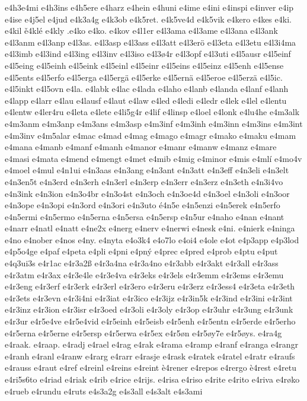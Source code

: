 e4h3e4mi
e4h3ins
e4h5ere
e4harz
e4hein
e4huni
e4ime
e4ini
e4inspi
e4inver
e4ip
e4ise
e4j5el
e4jud
e4k3a4g
e4k3ob
e4k5ret.
e4k5ve4d
e4k5vik
e4kero
e4kes
e4ki.
e4kil
ě4klé
e4kly
.e4ko
e4ko.
e4kov
e4l1er
e4l3ama
e4l3ame
e4l3ana
e4l3ank
e4l3anm
e4l3anp
e4l3as.
e4l3asp
e4l3ass
e4l3att
e4l3erö
e4l3eta
e4l3etu
e4l3i4ma
e4l3imb
e4l3ind
e4l3ing
e4l3inv
e4l3iso
e4l3ø4r
e4l3opf
e4l3uti
e4l5ausr
e4l5einf
e4l5eing
e4l5einh
e4l5eink
e4l5einl
e4l5einr
e4l5eins
e4l5einz
e4l5enh
e4l5ense
e4l5ents
e4l5erfo
e4l5erga
e4l5ergä
e4l5erke
e4l5ernä
e4l5eroe
e4l5erzä
e4l5ic.
e4l5inkt
e4l5ovn
e4la.
e4labk
e4lac
e4lada
e4laho
e4lanb
e4landa
e4lanf
e4lanh
e4lapp
e4larr
e4lau
e4lausf
e4laut
e4law
e4led
e4ledi
e4ledr
e4lek
e4lel
e4lentu
e4lentw
e4ler4ru
e4leta
e4lete
e4li5g4r
e4lif
e4linsp
e4loel
e4lonk
e4lu4he
e4m3alk
e4m3anm
e4m3anp
e4m3ans
e4m3asp
e4m3inf
e4m3inh
e4m3inn
e4m3ins
e4m3int
e4m3inv
e4m5alar
e4mac
e4mad
e4mag
e4mago
e4magr
e4mako
e4maku
e4mam
e4mana
e4manb
e4manf
e4manh
e4manor
e4manr
e4manw
e4manz
e4mare
e4masi
e4mata
e4mend
e4mengt
e4met
e4mib
e4mig
e4minor
e4mis
e4mlí
e4mo4v
e4moel
e4mul
e4n1ui
e4n3aas
e4n3ang
e4n3ant
e4n3att
e4n3eff
e4n3eli
e4n3elt
e4n3en5t
e4n3erd
e4n3erh
e4n3erl
e4n3erp
e4n3err
e4n3erz
e4n3eth
e4n3i4vo
e4n3ink
e4n3ion
e4n3o4br
e4n3o4st
e4n3och
e4n3oe4d
e4n3oel
e4n3oli
e4n3oor
e4n3ope
e4n3opi
e4n3ord
e4n3ori
e4n3uto
é4n5e
e4n5enzi
e4n5erek
e4n5erfo
e4n5ermi
e4n5ermo
e4n5erna
e4n5ersa
e4n5ersp
e4n5ur
e4naho
e4nan
e4nant
e4narr
e4natl
e4natt
e4ne2x
e4nerg
e4nerv
e4nerwi
e4nesk
e4ni.
e4nierk
e4ninga
e4no
e4nober
e4nos
e4ny.
e4nyta
e4o3k4
e4o7lo
e4oi4
e4ole
e4ot
e4p3app
e4p3lod
e4p5o4ge
e4paf
e4peta
e4pli
e4pni
e4pný
e4prec
e4pred
e4prob
e4ptu
e4put
e4q3ui3s
e4r1ac
e4r3a2ß
e4r3a4na
e4r3a4no
e4r3abb
e4r3akt
e4r3all
e4r3ass
e4r3atm
e4r3ax
e4r3e4le
e4r3e4va
e4r3eks
e4r3els
e4r3emm
e4r3ems
e4r3emu
e4r3eng
e4r3erf
e4r3erk
e4r3erl
e4r3ero
e4r3eru
e4r3erz
e4r3ess4
e4r3eta
e4r3eth
e4r3ets
e4r3evn
e4r3i4ni
e4r3iat
e4r3ico
e4r3ijz
e4r3in5k
e4r3ind
e4r3ini
e4r3int
e4r3inz
e4r3ion
e4r3isr
e4r3oed
e4r3oli
e4r3oly
e4r3op
e4r3uhr
e4r3ung
e4r3unk
e4r3ur
e4r5e4ve
e4r5e4vid
e4r5einh
e4r5eisb
e4r5enh
e4r5entn
e4r5erde
e4r5erho
e4r5erna
e4r5erne
e4r5ersp
e4r5erwa
e4r5ex
e4r5øn
e4r5øy7e
e4r5øys.
e4ra4g
e4raak.
e4raap.
e4radj
e4rael
e4rag
e4rak
e4rama
e4ramp
e4ranf
e4ranga
e4rangr
e4ranh
e4ranl
e4ranw
e4rarg
e4rarr
e4rasje
e4rask
e4ratek
e4ratel
e4ratr
e4raufs
e4rauss
e4raut
e4ref
e4reinl
e4reins
e4reint
è4rener
e4repos
e4rergo
è4rest
e4retu
e4ri5s6to
e4riad
e4riak
e4rib
e4rice
e4rijs.
e4risa
e4riso
e4rite
e4rito
e4riva
e4røko
e4rueb
e4rundu
e4ruts
e4s3a2g
e4s3all
e4s3alt
e4s3ami

